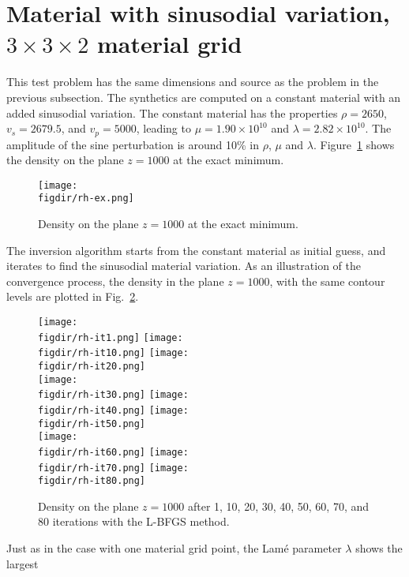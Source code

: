\documentclass[12pt]{report}
\def\figdir{mfigs}
\begin{document}
\section{Material with sinusodial variation, $3\times 3\times 2$ material grid}
This test problem has the same dimensions and source as the problem in the previous subsection. The 
synthetics are computed on a constant material with an added sinusodial variation. The constant material has the 
properties $\rho=2650$, $v_s=2679.5$, and $v_p=5000$, leading to $\mu=1.90\times 10^{10}$ and
$\lambda=2.82\times 10^{10}$.
The amplitude of the sine perturbation is around 10\% in $\rho$, $\mu$ and $\lambda$. 
Figure~\ref{fig:exactm} shows the density on the plane $z=1000$ at the exact minimum. 
\begin{figure}
\begin{center}
\texttt{[image: \\figdir/rh-ex.png]}\hfil
\caption{Density on the plane $z=1000$ at the exact minimum.}
\label{fig:exactm}
\end{center}
\end{figure}
\par
The inversion algorithm starts from the constant material as initial guess, and iterates to find the
sinusodial material variation. As an illustration of the convergence process, the density 
in the plane $z=1000$, with the same contour levels are plotted in Fig.~\ref{fig:rho-its}.
\begin{figure}
\begin{center}
\texttt{[image: \\figdir/rh-it1.png]}\hfil
\texttt{[image: \\figdir/rh-it10.png]}\hfil
\texttt{[image: \\figdir/rh-it20.png]} \\
\texttt{[image: \\figdir/rh-it30.png]}\hfil
\texttt{[image: \\figdir/rh-it40.png]}\hfil
\texttt{[image: \\figdir/rh-it50.png]} \\
\texttt{[image: \\figdir/rh-it60.png]}\hfil
\texttt{[image: \\figdir/rh-it70.png]}\hfil
\texttt{[image: \\figdir/rh-it80.png]} \\
\caption{Density on the plane $z=1000$ after 1, 10, 20, 30, 40, 50, 60, 70, and 80 iterations
with the L-BFGS method.}
\label{fig:rho-its}
\end{center}
\end{figure}
\par
Just as in the case with one material grid point, the Lam\'e parameter $\lambda$ shows the largest
\end{document}
